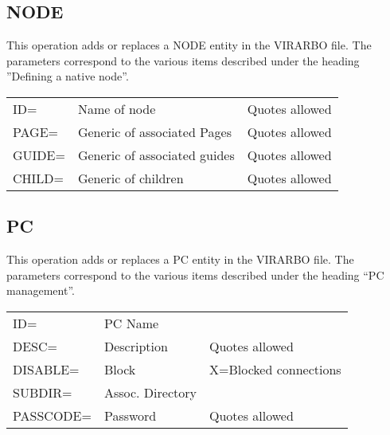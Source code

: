 \documentclass[letterpaper,10pt,english]{sphinxmanual}
\begin{document}
\subsection{NODE}
\label{\detokenize{Installation_Guide:node}}\label{\detokenize{Installation_Guide:index-32}}
This operation adds or replaces a NODE entity in the VIRARBO file. The parameters correspond to the various items described under the heading ”Defining a native node”.


\begin{savenotes}\sphinxattablestart
\centering
\begin{tabulary}{\linewidth}[t]{|T|T|T|}
\hline
{}\relax &\relax &\relax \\
\hline
ID=
&
Name of node
&
Quotes allowed
\\
\hline
PAGE=
&
Generic of associated Pages
&
Quotes allowed
\\
\hline
GUIDE=
&
Generic of associated guides
&
Quotes allowed
\\
\hline
CHILD=
&
Generic of children
&
Quotes allowed
\\
\hline
\end{tabulary}
\par
\sphinxattableend\end{savenotes}


\subsection{PC}
\label{\detokenize{Installation_Guide:pc}}\label{\detokenize{Installation_Guide:index-33}}
This operation adds or replaces a PC entity in the VIRARBO file. The parameters correspond to the various items described under the heading “PC management”.


\begin{savenotes}\sphinxattablestart
\centering
\begin{tabulary}{\linewidth}[t]{|T|T|T|}
\hline
{}\relax &\relax &\relax \\
\hline
ID=
&
PC Name
&\\
\hline
DESC=
&
Description
&
Quotes allowed
\\
\hline
DISABLE=
&
Block
&
X=Blocked connections
\\
\hline
SUBDIR=
&
Assoc. Directory
&\\
\hline
PASSCODE=
&
Password
&
Quotes allowed
\\
\hline
\end{tabulary}
\par
\sphinxattableend\end{savenotes}
\end{document}
